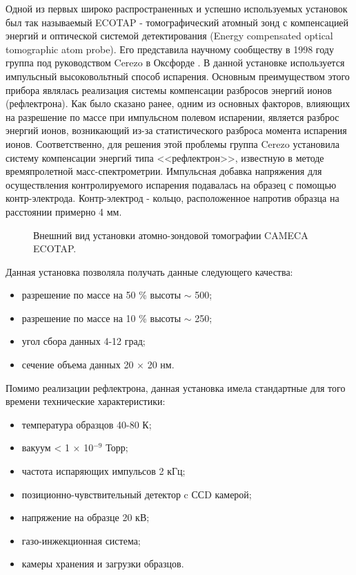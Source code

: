 Одной из первых широко распространенных и успешно используемых установок был так называемый ECOTAP - томографический атомный зонд с компенсацией энергий и оптической системой детектирования (Energy compensated optical tomographic atom probe). Его представила научному сообществу в 1998 году группа под руководством Cerezo в Оксфорде \cite{Cerezo98}. В данной установке используется импульсный высоковольтный способ испарения. Основным преимуществом этого прибора являлась реализация системы компенсации разбросов энергий ионов (рефлектрона). Как было сказано ранее, одним из основных факторов, влияющих на разрешение по массе при импульсном полевом испарении, является разброс энергий ионов, возникающий из-за статистического разброса момента испарения ионов. Соответственно, для решения этой проблемы группа Cerezo установила систему компенсации энергий типа <<рефлектрон>>, известную в методе времяпролетной масс-спектрометрии. Импульсная добавка напряжения для осуществления контролируемого испарения подавалась на образец с помощью контр-электрода. Контр-электрод - кольцо, расположенное напротив образца на расстоянии примерно 4 мм.

\begin{figure}[htb]
	\caption{Внешний вид установки атомно-зондовой томографии CAMECA ECOTAP.}
	\label{fig:ECOTAP}
\end{figure}
Данная установка позволяла получать данные следующего качества:
\begin{itemize}[beginpenalty=10000] %
	\item разрешение по массе на 50 \% высоты  $\sim$ 500;
	\item разрешение по массе на 10 \% высоты $\sim$ 250;
	\item угол сбора данных 4-12 град;
	\item сечение объема данных 20 × 20 нм.  
\end{itemize}

	
Помимо реализации рефлектрона, данная установка имела стандартные для того времени технические характеристики:
\begin{itemize}[beginpenalty=10000] %
	\item температура образцов 40-80 К;
	\item вакуум < 1 × 10$^{-9}$ Торр; 
	\item частота испаряющих импульсов 2 кГц;
	\item позиционно-чувствительный детектор c ССD камерой;
	\item напряжение на образце 20 кВ; 
	\item газо-инжекционная система;
	\item камеры хранения и загрузки образцов.
\end{itemize}


